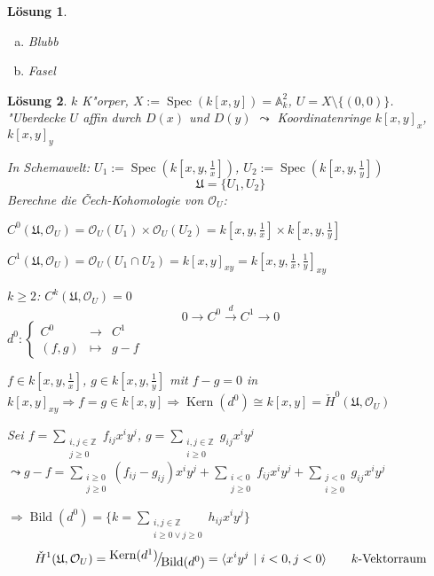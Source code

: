 \documentclass[paper = A4, fontsize=12pt, numbers=noendperiod, chapterprefix=true]{scrbook}
\theoremstyle{break}
\newtheorem{Loes}{L\"osung}
\theoremstyle{nonumberbreak}
\theoremstyle{nonumberplain}
\newcommand{\Sum}{\sum\limits}
\DeclareMathOperator{\Bild}{Bild}
\DeclareMathOperator{\Kern}{Kern}
\DeclareMathOperator{\Spec}{Spec}
\newcommand{\A}{\mathbb{A}}
\newcommand{\Z}{\mathbb{Z}}
\newcommand{\calO}{\mathcal{O}}
\newcommand{\X}{\times}
\newcommand{\FakRaum}[2]{
	\raisebox{0.7ex}{\ensuremath{#1}}
	\ensuremath{\mkern-3mu}\big/\ensuremath{\mkern-3mu}
	\raisebox{-0.6ex}{\ensuremath{#2}}}
\begin{document}
\begin{Loes}
\begin{enumerate}[a)]
	$J^{n+1}$ injektiv, $\FakRaum{I^n}{\Kern(d^n)} \hookrightarrow I^{n+1}$ Monomorphismus $\Rightarrow$ Es gibt Fortsetzung $\alpha^{n+1} : I^{n+1} \to J^{n+1}$ von $e^n \circ a^n$. Nach Konstruktion gilt: $\alpha^{n+1} \circ d^n = e^n \circ \alpha^n$
\item
	Blubb
\item
	Fasel
\end{enumerate}\end{Loes}

\begin{Loes}
$k$ K"orper, $X := \Spec (k[x,y]) = \A_k^2$, $U= X \setminus \{(0, 0)\}$. "Uberdecke  $U$ affin durch $D(x)$ und $D(y)$ $\leadsto$ Koordinatenringe $k[x,y]_x$, $k[x,y]_y$

In Schemawelt: $U_1 := \Spec (k[x, y, \frac{1}{x}])$, $U_2 := \Spec (k[x, y, \frac{1}{y}])$
	\[ \mathfrak U = \{U_1, U_2\} \]
Berechne die \v{C}ech-Kohomologie von $\calO_U$:

$C^0(\mathfrak U, \calO_U) = \calO_U(U_1) \X \calO_U(U_2) = k[x, y, \frac{1}{x}] \X k[x, y, \frac{1}{y}]$

$C^1(\mathfrak U, \calO_U) = \calO_U(U_1 \cap U_2) = k[x, y]_{xy} = k[x, y, \frac{1}{x}, \frac{1}{y}]_{xy}$

$k \ge 2$: $C^k(\mathfrak U, \calO_U) = 0$
	\[ 0 \to C^0 \overset{d}{\to} C^1 \to 0 \]
$d^0: \left\{ \begin{array}{ccc} C^0 &\to& C^1 \\ (f,g) &\mapsto& g-f \end{array} \right.$

$f \in k[x, y, \frac{1}{x}]$, $g \in k[x, y, \frac{1}{y}]$ mit $f - g = 0$ in $k[x,y]_{xy} \Rightarrow f = g \in k[x, y] \Rightarrow \Kern(d^0) \cong k[x,y] = \check{H}^0(\mathfrak U, \calO_U)$

Sei $f = \Sum_{\substack{i, j \in \Z \\ j \ge 0}} f_{ij} x^i y^j$, $g = \Sum_{\substack{i, j \in \Z \\ i \ge 0}} g_{ij} x^i y^j$ $\leadsto g - f = \Sum_{\substack{i \ge 0 \\ j \ge 0}} (f_{ij} - g_{ij}) x^{i} y^j + \Sum_{\substack{i < 0 \\ j \ge 0}} f_{ij} x^{i}y^j + \Sum_{\substack{j < 0 \\ i \ge 0}} g_{ij} x^{i} y^j$

$\Rightarrow \Bild(d^0) = \{ k = \Sum_{\substack{i,j \in \Z \\ i \ge 0 \vee j \ge 0}} h_{ij} x^{i} y^j \}$
	\[ \check{H}^1(\mathfrak U, \calO_U) = \FakRaum{\Kern(d^1)}{\Bild(d^0)} = \langle x^{i} y^j \  \vert \ i < 0, j < 0 \rangle \qquad k\text{-Vektorraum}\]
\end{Loes}
\end{document}

